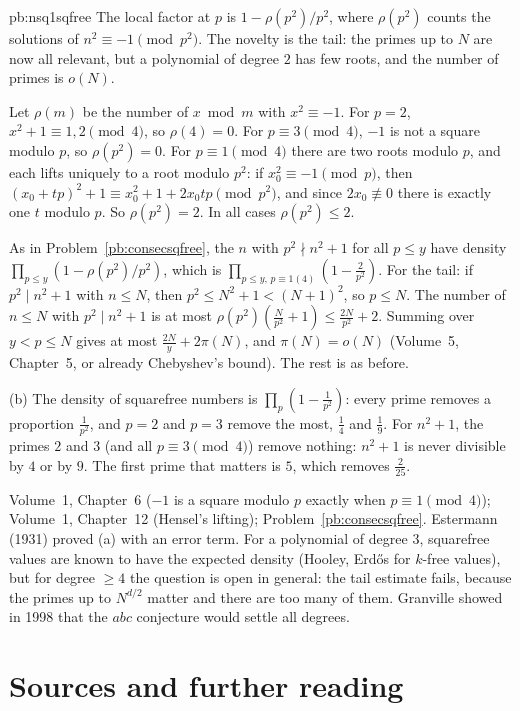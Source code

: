 \begin{solution}{pb:nsq1sqfree}
\idea The local factor at $p$ is $1-\rho(p^2)/p^2$, where $\rho(p^2)$ counts the solutions of $n^2\equiv-1\pmod{p^2}$. The novelty
is the tail: the primes up to $N$ are now all relevant, but a polynomial of degree $2$ has few roots, and the number of primes
is $o(N)$.

\writeup Let $\rho(m)$ be the number of $x\bmod m$ with $x^2\equiv-1$. For $p=2$, $x^2+1\equiv1,2\pmod4$, so $\rho(4)=0$. For $p\equiv3\pmod4$,
$-1$ is not a square modulo $p$, so $\rho(p^2)=0$. For $p\equiv1\pmod4$ there are two roots modulo $p$, and each lifts uniquely to
a root modulo $p^2$: if $x_0^2\equiv-1\pmod p$, then $(x_0+tp)^2+1\equiv x_0^2+1+2x_0tp\pmod{p^2}$, and since $2x_0\not\equiv0$ there is
exactly one $t$ modulo $p$. So $\rho(p^2)=2$. In all cases $\rho(p^2)\le2$.

As in Problem~\ref{pb:consecsqfree}, the $n$ with $p^2\nmid n^2+1$ for all $p\le y$ have density $\prod_{p\le y}(1-\rho(p^2)/p^2)$, which is
$\prod_{p\le y,\,p\equiv1(4)}(1-\frac2{p^2})$. For the tail: if $p^2\mid n^2+1$ with $n\le N$, then $p^2\le N^2+1<(N+1)^2$, so $p\le N$. The
number of $n\le N$ with $p^2\mid n^2+1$ is at most $\rho(p^2)(\frac N{p^2}+1)\le\frac{2N}{p^2}+2$. Summing over $y<p\le N$ gives at most
$\frac{2N}y+2\pi(N)$, and $\pi(N)=o(N)$ (Volume~5, Chapter~5, or already Chebyshev's bound). The rest is as before.

(b) The density of squarefree numbers is $\prod_p(1-\frac1{p^2})$: every prime removes a proportion $\frac1{p^2}$, and $p=2$ and $p=3$
remove the most, $\frac14$ and $\frac19$. For $n^2+1$, the primes $2$ and $3$ (and all $p\equiv3\pmod4$) remove nothing: $n^2+1$ is never
divisible by $4$ or by $9$. The first prime that matters is $5$, which removes $\frac2{25}$.

\tools Volume~1, Chapter~6 ($-1$ is a square modulo $p$ exactly when $p\equiv1\pmod4$); Volume~1, Chapter~12 (Hensel's lifting);
Problem~\ref{pb:consecsqfree}.
\leads Estermann (1931) proved (a) with an error term. For a polynomial of degree $3$, squarefree values are known to have the
expected density (Hooley, Erdős for $k$-free values), but for degree $\ge4$ the question is open in general: the tail estimate
fails, because the primes up to $N^{d/2}$ matter and there are too many of them. Granville showed in 1998 that the $abc$
conjecture would settle all degrees.
\end{solution}

\section*{Sources and further reading}

